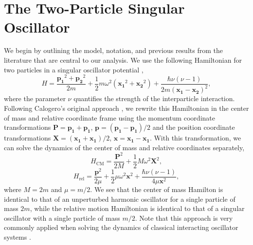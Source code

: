 \documentclass[preprints,article,accept,moreauthors,pdftex]{Definitions/mdpi}
\begin{document}
\section{The Two-Particle Singular Oscillator}

We begin by outlining the model, notation, and previous results from the literature that are central to our analysis. We use the following Hamiltonian for two particles in a singular oscillator potential \cite{Ballhausen19882, Murthy1994},
\begin{equation}
	\label{2partHamil}
	H = \frac{\mathbf{p_1}^2+\mathbf{p_2}^2}{2m}+\frac{1}{2} m \omega^2 \left( \mathbf{x_1}^2+\mathbf{x_2}^2\right) + \frac{\hbar \nu (\nu-1)}{2 m (\mathbf{x_1}-\mathbf{x_2})^2},
\end{equation}
where the parameter $\nu$ quantifies the strength of the interparticle interaction. Following Calogero's original approach \cite{Calogero1969}, we rewrite this Hamiltonian in the center of mass and relative coordinate frame using the momentum coordinate transformations $\mathbf{P} = \mathbf{p_1}+\mathbf{p_1}$, $\mathbf{p} = (\mathbf{p_1}-\mathbf{p_1})/2$ and the position coordinate transformations $\mathbf{X} = (\mathbf{x_1}+\mathbf{x_1})/2$, $\mathbf{x} = \mathbf{x_1}-\mathbf{x_1}$. With this transformation, we can solve the dynamics of the center of mass and relative coordinates separately,
\begin{equation}
	\label{CMHamiltonian}
	H_{\mathrm{CM}} = \frac{\mathbf{P}^2}{2 M} + \frac{1}{2} M \omega^2 \mathbf{X}^2,
\end{equation}     
\begin{equation}
	\label{relHamiltonian}
	H_{\mathrm{rel}} = \frac{\mathbf{p}^2}{2 \mu} + \frac{1}{2} \mu \omega^2 \mathbf{x}^2 + \frac{\hbar \nu (\nu-1)}{4 \mu \mathbf{x}^2},
\end{equation}
where $M = 2m$ and $\mu = m/2$. We see that the center of mass Hamilton is identical to that of an unperturbed harmonic oscillator for a single particle of mass $2m$, while the relative motion Hamiltonian is identical to that of a singular oscillator with a single particle of mass $m/2$. Note that this approach is very commonly applied when solving the dynamics of classical interacting oscillator systems \cite{GoldsteinBook}.     
\end{document}

